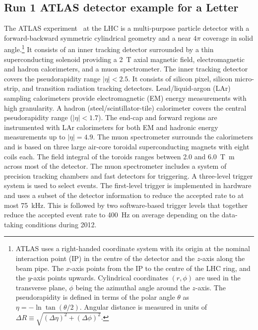 \newcommand{\AtlasCoordFootnote}{%
ATLAS uses a right-handed coordinate system with its origin at the nominal interaction point (IP)
in the centre of the detector and the $z$-axis along the beam pipe.
The $x$-axis points from the IP to the centre of the LHC ring,
and the $y$-axis points upwards.
Cylindrical coordinates $(r,\phi)$ are used in the transverse plane, 
$\phi$ being the azimuthal angle around the $z$-axis.
The pseudorapidity is defined in terms of the polar angle $\theta$ as $\eta = -\ln \tan(\theta/2)$.
Angular distance is measured in units of $\Delta R \equiv \sqrt{(\Delta\eta)^{2} + (\Delta\phi)^{2}}$.}

\subsection{Run 1 ATLAS detector example for a Letter}
\label{sec:atlas1}

The ATLAS experiment~\cite{PERF-2007-01} at the LHC is a multi-purpose particle detector
with a forward-backward symmetric cylindrical geometry and a near $4\pi$ coverage in 
solid angle.\footnote{\AtlasCoordFootnote}
It consists of an inner tracking detector surrounded by a thin superconducting solenoid
providing a \SI{2}{\tesla} axial magnetic field, electromagnetic and hadron calorimeters, and a muon spectrometer.
The inner tracking detector covers the pseudorapidity range $|\eta| < 2.5$.
It consists of silicon pixel, silicon micro-strip, and transition radiation tracking detectors.
Lead/liquid-argon (LAr) sampling calorimeters provide electromagnetic (EM) energy measurements
with high granularity.
A hadron (steel/scintillator-tile) calorimeter covers the central pseudorapidity range ($|\eta| < 1.7$).
The end-cap and forward regions are instrumented with LAr calorimeters
for both EM and hadronic energy measurements up to $|\eta| = 4.9$.
The muon spectrometer surrounds the calorimeters and is based on
three large air-core toroidal superconducting magnets with eight coils each.
The field integral of the toroids ranges between \num{2.0} and \SI{6.0}{\tesla\metre}
across most of the detector. 
The muon spectrometer includes a system of precision tracking chambers and fast detectors for triggering.
A three-level trigger system is used to select events.
The first-level trigger is implemented in hardware and uses a subset of the detector information
to reduce the accepted rate to at most \SI{75}{\kilo\hertz}.
This is followed by two software-based trigger levels that
together reduce the accepted event rate to \SI{400}{\hertz} on average
depending on the data-taking conditions during 2012.


